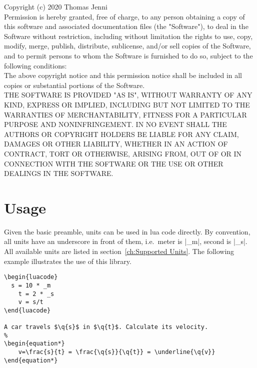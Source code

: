 \documentclass{ltxdoc}
\newcommand{\q}[1]{%
  \directlua{tex.print(physical.Quantity.tosiunitx(#1,"add-decimal-zero=true,scientific-notation=fixed,exponent-to-prefix=false"))}%
}
\begin{document}
Copyright (c) 2020 Thomas Jenni\\

Permission is hereby granted, free of charge, to any person obtaining a copy of this software and associated documentation files (the "Software"), to deal in the Software without restriction, including without limitation the rights to use, copy, modify, merge, publish, distribute, sublicense, and/or sell copies of the Software, and to permit persons to whom the Software is furnished to do so, subject to the following conditions:\\

The above copyright notice and this permission notice shall be included in all copies or substantial portions of the Software.\\

THE SOFTWARE IS PROVIDED "AS IS", WITHOUT WARRANTY OF ANY KIND, EXPRESS OR IMPLIED, INCLUDING BUT NOT LIMITED TO THE WARRANTIES OF MERCHANTABILITY, FITNESS FOR A PARTICULAR PURPOSE AND NONINFRINGEMENT. IN NO EVENT SHALL THE AUTHORS OR COPYRIGHT HOLDERS BE LIABLE FOR ANY CLAIM, DAMAGES OR OTHER LIABILITY, WHETHER IN AN ACTION OF CONTRACT, TORT OR OTHERWISE, ARISING FROM, OUT OF OR IN CONNECTION WITH THE SOFTWARE OR THE USE OR OTHER DEALINGS IN THE SOFTWARE.



\newpage
\section{Usage}
\label{ch:usage}

Given the basic preamble, units can be used in lua code directly. By convention, all units have an underscore in front of them, i.e.\ meter is |_m|, second is |_s|. All available units are listed in section~\ref{ch:Supported Units}. The following example illustrates the use of this library.

\begin{lstlisting}[caption=Velocity of a car.,label=lst:Car Velocity]
\begin{luacode}
  s = 10 * _m
	t = 2 * _s
	v = s/t
\end{luacode}

A car travels $\q{s}$ in $\q{t}$. Calculate its velocity.
%
\begin{equation*}
	v=\frac{s}{t} = \frac{\q{s}}{\q{t}} = \underline{\q{v}}
\end{equation*}
\end{lstlisting}
\end{document}
